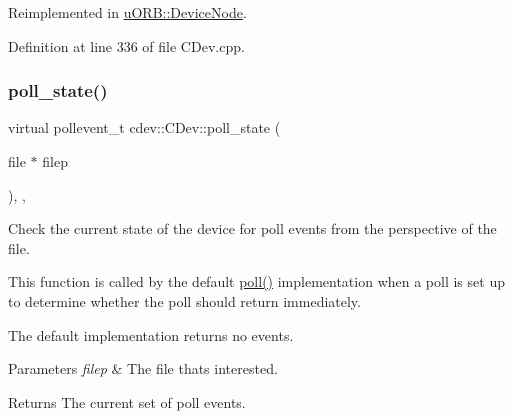 Reimplemented in \hyperlink{classuORB_1_1DeviceNode_a77061c03defdcb3eedfc9cdc8b38c003}{u\+O\+R\+B\+::\+Device\+Node}.



Definition at line 336 of file C\+Dev.\+cpp.


\mbox{\label{classcdev_1_1CDev_abf40a822665b0889584268e8a4dfbef2}} 
\subsubsection{\texorpdfstring{poll\+\_\+state()}{poll\_state()}}
{\footnotesize\ttfamily virtual pollevent\+\_\+t cdev\+::\+C\+Dev\+::poll\+\_\+state (\begin{DoxyParamCaption}\item[{file $\ast$}]{filep }\end{DoxyParamCaption})\hspace{0.3cm}{\ttfamily [inline]}, {\ttfamily [protected]}, {\ttfamily [virtual]}}

Check the current state of the device for poll events from the perspective of the file.

This function is called by the default \hyperlink{classcdev_1_1CDev_a219a565bb1842c62e0f45a7eeaaec0d3}{poll()} implementation when a poll is set up to determine whether the poll should return immediately.

The default implementation returns no events.


\begin{DoxyParams}{Parameters}
{\em filep} & The file that\textquotesingle{}s interested. \\
\hline
\end{DoxyParams}
\begin{DoxyReturn}{Returns}
The current set of poll events. 
\end{DoxyReturn}


